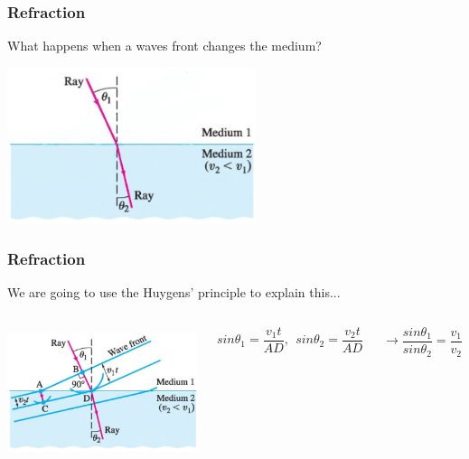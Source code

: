 \documentclass[]{beamer}
\begin{document}
\begin{frame}

\frametitle{Refraction}

What happens when a waves front changes the medium?
\pause

  \begin{center}
  \includegraphics[height=1.8in]{images5/Refraction0.jpg}
\end{center}






  \end{frame}







\begin{frame}

\frametitle{Refraction}

We are going to use the Huygens' principle to explain this...
\pause





   \begin{columns}[c]
   \column{2in}  %

    \begin{center}
  \includegraphics[height=1.5in]{images5/Refraction.jpg}
\end{center}


   \column{2in}

\pause

\begin{equation*}
sin\theta_1=\frac{v_1 t}{AD},\ \ sin\theta_2=\frac{v_2 t }{AD}
\end{equation*}

\pause


\begin{equation*}
\rightarrow \frac{sin\theta_1}{sin\theta_2}=\frac{v_1}{v_2}
\end{equation*}




   \end{columns}


  \end{frame}
\end{document}
